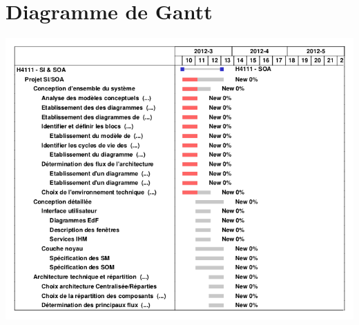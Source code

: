 \section{Diagramme de Gantt}

\begin {center}
\includegraphics[width=\textwidth]{gantt.png}
\end {center}
